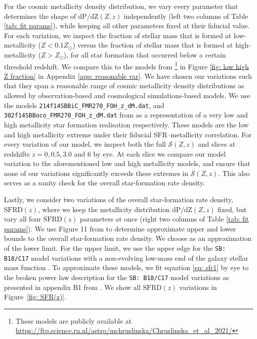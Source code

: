 \documentclass[linenumbers,twocolumn]{aastex631}
\newcommand{\SFRDzZ}{\ensuremath{\mathcal{S}(Z,z)}\xspace}
\newcommand{\SFRDz}{\ensuremath{\mathrm{SFRD}(z)}\xspace}
\newcommand{\dpdZ}{\ensuremath{\mathrm{dP/dZ}(Z,z)}\xspace}
\begin{document}
For the cosmic metallicity density distribution, we vary every parameter that determines the shape of \dpdZ independently (left two columns of Table \ref{tab: fit params}), while keeping all other parameters fixed at their fiducial value.
For each variation, we inspect the fraction of stellar mass that is formed at low-metallicity ($Z<0.1 Z_{\odot}$) versus the fraction of stellar mass that is formed at high-metallicity ($Z> Z_{\odot}$), for all star formation that occurred below a certain threshold redshift.
We compare this to the models from \cite{Chruslinska+2021}\footnote{These models are publicly available at \url{https://ftp.science.ru.nl/astro/mchruslinska/Chruslinska_et_al_2021/}} in Figure \ref{fig: low high Z fraction} in Appendix \ref{app: reasonable var}.
We have chosen our variations such that they span a reasonable range of cosmic metallicity density distributions as allowed by observation-based and cosmological simulations-based models.
We use the models \texttt{214f14SBBiC\_FMR270\_FOH\_z\_dM.dat}, and \texttt{302f14SBBoco\_FMR270\_FOH\_z\_dM.dat} from \cite{Chruslinska+2021} as a representation of a very low and high metallicity star formation realisation respectively. These models are the low and high metallicity extreme under their fiducial SFR–metallicity correlation.
For every variation of our model, we inspect both the full \SFRDzZ and slices at redshifts $z = 0, 0.5, 3.0$ and $6$ by eye. At each slice we compare our model variation to the aforementioned low and high metallicity models, and ensure that none of our variations significantly exceeds these extremes in \SFRDzZ. This also serves as a sanity check for the overall star-formation rate density.


Lastly, we consider two variations of the overall star-formation rate density, \SFRDz, where we keep the metallicity distribution \dpdZ fixed, but vary all four \SFRDz parameters at once (right two columns of Table \ref{tab: fit params}). 
We use Figure 11 from \cite{Chruslinska+2021} to determine approximate upper and lower bounds to the overall star-formation rate density. We choose \cite{Madau+2017} as an approximation of the lower limit. For the upper limit, we use the upper edge for the \texttt{SB: B18/C17} model variations with a non-evolving low-mass end of the galaxy stellar mass function \citep[table B1 from][also shown as thick brown line in their Fig. 11]{Chruslinska+2021}. To approximate these models, we fit equation \ref{eq: sfr1} by eye to the broken power law description for the  \texttt{SB: B18/C17} model variations as presented in appendix B1 from \cite{Chruslinska+2021}.
We show all \SFRDz variations in Figure~\ref{fig: SFR(z)}. \\
\end{document}
